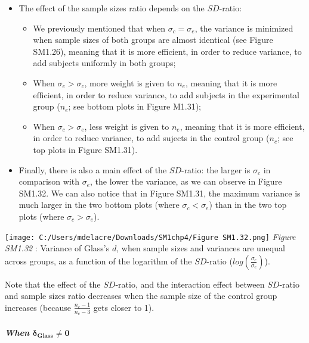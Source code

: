\documentclass[
  english,
  man,mask,floatsintext]{apa6}
\providecommand{\tightlist}{%
  \setlength{\itemsep}{0pt}\setlength{\parskip}{0pt}}
\let\oldsubparagraph\subparagraph
\renewcommand{\subparagraph}[1]{\oldsubparagraph{#1}\mbox{}}
\begin{document}
\begin{itemize}
\tightlist
\item
  The effect of the sample sizes ratio depends on the \(SD\)-ratio:

  \begin{itemize}
  \tightlist
  \item
    We previously mentioned that when \(\sigma_c=\sigma_e\), the variance is minimized when sample sizes of both groups are almost identical (see Figure SM1.26), meaning that it is more efficient, in order to reduce variance, to add subjects uniformly in both groups;\\
  \item
    When \(\sigma_e > \sigma_c\), more weight is given to \(n_e\), meaning that it is more efficient, in order to reduce variance, to add subjects in the experimental group (\(n_e\); see bottom plots in Figure M1.31);\\
  \item
    When \(\sigma_c > \sigma_e\), less weight is given to \(n_e\), meaning that it is more efficient, in order to reduce variance, to add sujects in the control group (\(n_c\); see top plots in Figure SM1.31).
  \end{itemize}
\item
  Finally, there is also a main effect of the \(SD\)-ratio: the larger is \(\sigma_c\) in comparison with \(\sigma_e\), the lower the variance, as we can observe in Figure SM1.32. We can also notice that in Figure SM1.31, the maximum variance is much larger in the two bottom plots (where \(\sigma_c<\sigma_e\)) than in the two top plots (where \(\sigma_c>\sigma_e\)).
\end{itemize}

\texttt{[image: C:/Users/mdelacre/Downloads/SM1chp4/Figure SM1.32.png]}
\emph{Figure SM1.32} : Variance of Glass's \(d\), when sample sizes and variances are unequal across groups, as a function of the logarithm of the \(SD\)-ratio (\(log \left( \frac{\sigma_c}{\sigma_e} \right)\)).

Note that the effect of the \(SD\)-ratio, and the interaction effect between \(SD\)-ratio and sample sizes ratio decreases when the sample size of the control group increases (because \(\frac{n_c-1}{n_c-3}\) gets closer to 1).

\hypertarget{when-bmdelta_glass-neq-0-2}{%
\subparagraph{\texorpdfstring{When \(\bm{\delta_{Glass} \neq 0}\)}{When \textbackslash bm\{\textbackslash delta\_\{Glass\} \textbackslash neq 0\}}}\label{when-bmdelta_glass-neq-0-2}}
\end{document}
